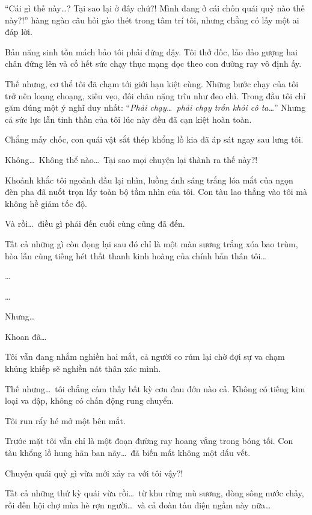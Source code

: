 \documentclass[../main.tex]{subfiles}
\begin{document}
``Cái gì thế này\dots? Tại sao lại ở đây chứ?! Mình đang ở cái chốn quái quỷ nào thế này?!'' hàng ngàn câu hỏi gào thét trong tâm trí tôi, nhưng chẳng có lấy một ai đáp lời.

Bản năng sinh tồn mách bảo tôi phải đứng dậy. Tôi thở dốc, lảo đảo gượng hai chân đứng lên và cố hết sức chạy thục mạng dọc theo con đường ray vô định ấy.

Thế nhưng, cơ thể tôi đã chạm tới giới hạn kiệt cùng. Những bước chạy của tôi trở nên loạng choạng, xiêu vẹo, đôi chân nặng trĩu như đeo chì. Trong đầu tôi chỉ găm đúng một ý nghĩ duy nhất: ``\textit{Phải chạy\dots\ phải chạy trốn khỏi cô ta\dots}'' Nhưng cả sức lực lẫn tinh thần của tôi lúc này đều đã cạn kiệt hoàn toàn.

Chẳng mấy chốc, con quái vật sắt thép khổng lồ kia đã áp sát ngay sau lưng tôi.

Không\dots\ Không thể nào\dots\ Tại sao mọi chuyện lại thành ra thế này?!

Khoảnh khắc tôi ngoảnh đầu lại nhìn, luồng ánh sáng trắng lóa mắt của ngọn đèn pha đã nuốt trọn lấy toàn bộ tầm nhìn của tôi. Con tàu lao thẳng vào tôi mà không hề giảm tốc độ.

Và rồi\dots\ điều gì phải đến cuối cùng cũng đã đến.

Tất cả những gì còn đọng lại sau đó chỉ là một màn sương trắng xóa bao trùm, hòa lẫn cùng tiếng hét thất thanh kinh hoàng của chính bản thân tôi\dots


\dots

\dots

Nhưng\dots

Khoan đã\dots

Tôi vẫn đang nhắm nghiền hai mắt, cả người co rúm lại chờ đợi sự va chạm khủng khiếp sẽ nghiền nát thân xác mình.

Thế nhưng\dots\ tôi chẳng cảm thấy bất kỳ cơn đau đớn nào cả. Không có tiếng kim loại va đập, không có chấn động rung chuyển.

Tôi run rẩy hé mở một bên mắt.

Trước mặt tôi vẫn chỉ là một đoạn đường ray hoang vắng trong bóng tối. Con tàu khổng lồ hung hãn ban nãy\dots\ đã biến mất không một dấu vết.

Chuyện quái quỷ gì vừa mới xảy ra với tôi vậy?!

Tất cả những thứ kỳ quái vừa rồi\dots\ từ khu rừng mù sương, dòng sông nước chảy, rồi đến hội chợ mùa hè rợn người\dots\ và cả đoàn tàu điện ngầm này nữa\dots
\end{document}
